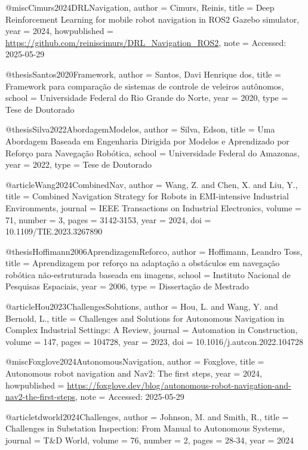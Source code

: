 @misc{Cimurs2024DRLNavigation,
  author = {Cimurs, Reinis},
  title = {Deep Reinforcement Learning for mobile robot navigation in ROS2 Gazebo simulator},
  year = {2024},
  howpublished = {\url{https://github.com/reiniscimurs/DRL_Navigation_ROS2}},
  note = {Accessed: 2025-05-29}
}

@thesis{Santos2020Framework,
  author = {Santos, Davi Henrique dos},
  title = {Framework para comparação de sistemas de controle de veleiros autônomos},
  school = {Universidade Federal do Rio Grande do Norte},
  year = {2020},
  type = {Tese de Doutorado}
}

@thesis{Silva2022AbordagemModelos,
  author = {Silva, Edson},
  title = {Uma Abordagem Baseada em Engenharia Dirigida por Modelos e Aprendizado por Reforço para Navegação Robótica},
  school = {Universidade Federal do Amazonas},
  year = {2022},
  type = {Tese de Doutorado}
}

@article{Wang2024CombinedNav,
  author = {Wang, Z. and Chen, X. and Liu, Y.},
  title = {Combined Navigation Strategy for Robots in EMI-intensive Industrial Environments},
  journal = {IEEE Transactions on Industrial Electronics},
  volume = {71},
  number = {3},
  pages = {3142-3153},
  year = {2024},
  doi = {10.1109/TIE.2023.3267890}
}

@thesis{Hoffimann2006AprendizagemReforco,
  author = {Hoffimann, Leandro Toss},
  title = {Aprendizagem por reforço na adaptação a obstáculos em navegação robótica não-estruturada baseada em imagens},
  school = {Instituto Nacional de Pesquisas Espaciais},
  year = {2006},
  type = {Dissertação de Mestrado}
}

@article{Hou2023ChallengesSolutions,
  author = {Hou, L. and Wang, Y. and Bernold, L.},
  title = {Challenges and Solutions for Autonomous Navigation in Complex Industrial Settings: A Review},
  journal = {Automation in Construction},
  volume = {147},
  pages = {104728},
  year = {2023},
  doi = {10.1016/j.autcon.2022.104728}
}

@misc{Foxglove2024AutonomousNavigation,
  author = {Foxglove},
  title = {Autonomous robot navigation and Nav2: The first steps},
  year = {2024},
  howpublished = {\url{https://foxglove.dev/blog/autonomous-robot-navigation-and-nav2-the-first-steps}},
  note = {Accessed: 2025-05-29}
}

@article{tdworld2024Challenges,
  author = {Johnson, M. and Smith, R.},
  title = {Challenges in Substation Inspection: From Manual to Autonomous Systems},
  journal = {T\&D World},
  volume = {76},
  number = {2},
  pages = {28-34},
  year = {2024}
}

